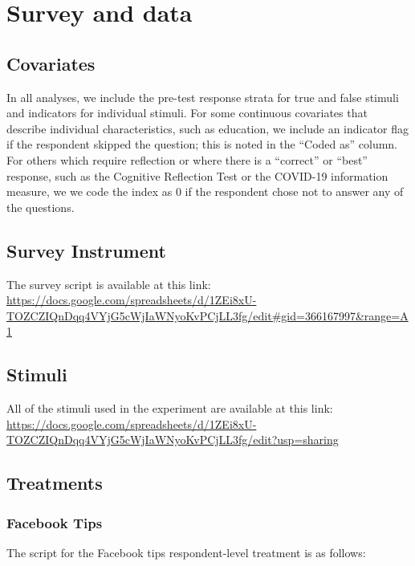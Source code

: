 \documentclass[letterpaper, 12pt, parskip=full,]{scrartcl}
\begin{document}
\section{Survey and data}\label{appendix:data}
\subsection{Covariates}\label{appendix:covariates}


In all analyses, we include the pre-test response strata for true and false stimuli and indicators for individual stimuli.
For some continuous covariates that describe individual characteristics, such as education, we include an indicator flag if the respondent skipped the question; this is noted in the ``Coded as'' column. For others which require reflection or where there is a ``correct'' or ``best'' response, such as the Cognitive Reflection Test or the COVID-19 information measure, we we code the index as 0 if the respondent chose not to answer any of the questions. 

\subsection{Survey Instrument}\label{appendix:survey}%
The survey script is available at this link:\\
\url{https://docs.google.com/spreadsheets/d/1ZEi8xU-TOZCZIQnDqq4VYjG5cWjIaWNyoKvPCjLL3fg/edit#gid=366167997&range=A1}

\subsection{Stimuli}\label{appendis:stimuli}
All of the stimuli used in the experiment are available at this link:\\
\url{https://docs.google.com/spreadsheets/d/1ZEi8xU-TOZCZIQnDqq4VYjG5cWjIaWNyoKvPCjLL3fg/edit?usp=sharing}


\subsection{Treatments}

\subsubsection{Facebook Tips}\label{sec:fbtips}
The script for the Facebook tips respondent-level treatment is as follows:
\end{document}
